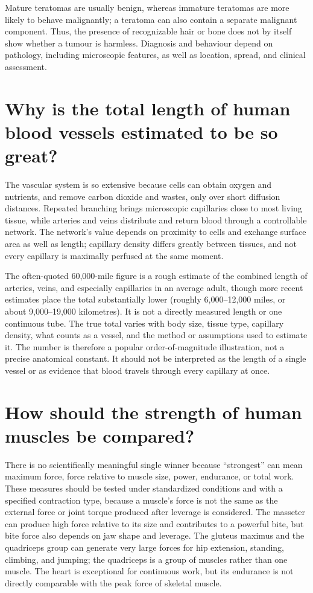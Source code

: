 \documentclass[11pt,oneside]{report}
\begin{document}
Mature teratomas are usually benign, whereas immature teratomas are more likely
to behave malignantly; a teratoma can also contain a separate malignant
component. Thus, the presence of recognizable hair or bone does not by itself
show whether a tumour is harmless. Diagnosis and behaviour depend on pathology,
including microscopic features, as well as location, spread, and clinical
assessment.

\section{Why is the total length of human blood vessels estimated to be so great?}

The vascular system is so extensive because cells can obtain oxygen and
nutrients, and remove carbon dioxide and wastes, only over short diffusion
distances. Repeated branching brings microscopic capillaries close to most
living tissue, while arteries and veins distribute and return blood through a
controllable network. The network's value depends on proximity to cells and
exchange surface area as well as length; capillary density differs greatly
between tissues, and not every capillary is maximally perfused at the same
moment.

The often-quoted 60,000-mile figure is a rough estimate of the combined length
of arteries, veins, and especially capillaries in an average adult, though more
recent estimates place the total substantially lower (roughly 6,000--12,000
miles, or about 9,000--19,000 kilometres). It is not a
directly measured length or one continuous tube. The true total varies with
body size, tissue type, capillary density, what counts as a vessel, and the
method or assumptions used to estimate it. The number is therefore a popular
order-of-magnitude illustration, not a precise anatomical constant. It should
not be interpreted as the length of a single vessel or as evidence that blood
travels through every capillary at once.

\section{How should the strength of human muscles be compared?}

There is no scientifically meaningful single winner because ``strongest'' can
mean maximum force, force relative to muscle size, power, endurance, or total
work. These measures should be tested under standardized conditions and with a
specified contraction type, because a muscle's force is not the same as the
external force or joint torque produced after leverage is considered. The
masseter can produce high force relative to its size and contributes to a
powerful bite, but bite force also depends on jaw shape and leverage. The
gluteus maximus and the quadriceps group can generate very large forces for hip
extension, standing, climbing, and jumping; the quadriceps is a group of
muscles rather than one muscle. The heart is exceptional for continuous work,
but its endurance is not directly comparable with the peak force of skeletal
muscle.
\end{document}
